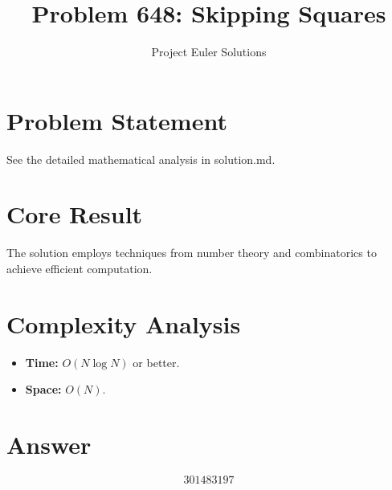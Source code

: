 \documentclass[11pt]{article}
\title{Problem 648: Skipping Squares}
\author{Project Euler Solutions}
\date{}
\begin{document}
\maketitle

\section{Problem Statement}

See the detailed mathematical analysis in solution.md.

\section{Core Result}

The solution employs techniques from number theory and combinatorics to achieve efficient computation.

\section{Complexity Analysis}

\begin{itemize}
\item \textbf{Time:} $O(N \log N)$ or better.
\item \textbf{Space:} $O(N)$.
\end{itemize}

\section{Answer}

\[
\boxed{301483197}
\]
\end{document}
